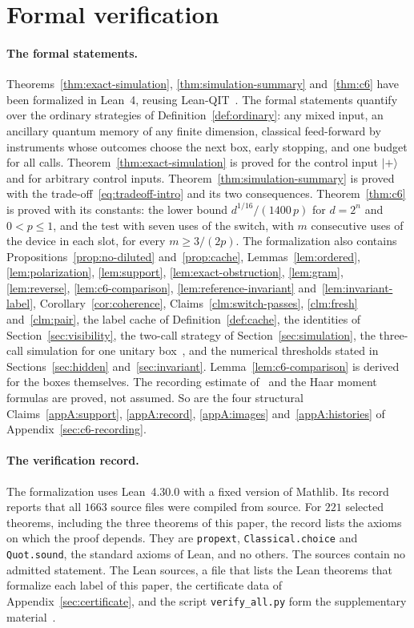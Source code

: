 \documentclass[11pt,letterpaper]{article}
\theoremstyle{definition}\newtheorem{definition}[theorem]{Definition}
\newcommand{\ket}[1]{\lvert#1\rangle}
\begin{document}
\section{Formal verification}\label{sec:formal-status}

\paragraph{The formal statements.}
Theorems~\ref{thm:exact-simulation}, \ref{thm:simulation-summary}
and~\ref{thm:c6} have been formalized in Lean~4, reusing
Lean-QIT~\cite{leanqit2026}. The formal statements quantify over the
ordinary strategies of Definition~\ref{def:ordinary}: any mixed input,
an ancillary quantum memory of any finite dimension, classical
feed-forward by instruments whose outcomes choose the next box, early
stopping, and one budget for all calls.
Theorem~\ref{thm:exact-simulation} is proved for the control input
$\ket+$ and for arbitrary control inputs.
Theorem~\ref{thm:simulation-summary} is proved with the
trade-off~\eqref{eq:tradeoff-intro} and its two consequences.
Theorem~\ref{thm:c6} is proved with its constants: the lower bound
$d^{1/16}/(1400\,p)$ for $d=2^n$ and $0<p\le1$, and the test with seven
uses of the switch, with $m$ consecutive uses of the device in each
slot, for every $m\ge3/(2p)$. The
formalization also contains Propositions~\ref{prop:no-diluted}
and~\ref{prop:cache}, Lemmas~\ref{lem:ordered},
\ref{lem:polarization}, \ref{lem:support}, \ref{lem:exact-obstruction},
\ref{lem:gram}, \ref{lem:reverse}, \ref{lem:c6-comparison},
\ref{lem:reference-invariant} and~\ref{lem:invariant-label},
Corollary~\ref{cor:coherence}, Claims~\ref{clm:switch-passes},
\ref{clm:fresh} and~\ref{clm:pair}, the label cache of
Definition~\ref{def:cache}, the identities of
Section~\ref{sec:visibility}, the two-call strategy of
Section~\ref{sec:simulation}, the three-call simulation for one
unitary box~\cite[Theorem~1]{bavaresco2025}, and the numerical
thresholds stated in Sections~\ref{sec:hidden}
and~\ref{sec:invariant}. Lemma~\ref{lem:c6-comparison} is derived for
the boxes themselves. The recording estimate of~\cite{mahuang2025} and the
Haar moment formulas are proved, not assumed. So are
the four structural Claims~\ref{appA:support}, \ref{appA:record},
\ref{appA:images} and~\ref{appA:histories} of
Appendix~\ref{sec:c6-recording}.

\paragraph{The verification record.}
The formalization uses Lean~4.30.0 with a fixed version of Mathlib. Its
record reports that all $1663$ source files were compiled from source.
For $221$ selected theorems,
including the three theorems of this paper, the record lists the axioms
on which the proof depends. They are \texttt{propext},
\texttt{Classical.choice} and \texttt{Quot.sound}, the standard axioms
of Lean, and no others. The sources contain no admitted statement. The
Lean sources, a file that lists the Lean theorems that formalize each
label of this paper, the certificate data of
Appendix~\ref{sec:certificate}, and the script \texttt{verify\_all.py}
form the supplementary material~\cite{repo}.
\end{document}
